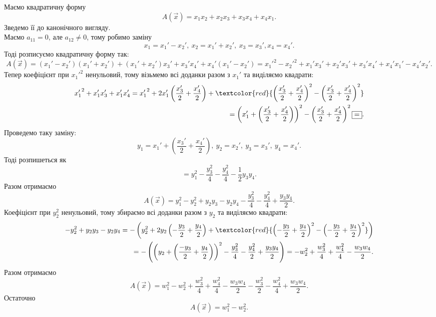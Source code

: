 \documentclass{math_library}
\begin{document}
\begin{example}
Маємо квадратичну форму 
\[
A(\vec{x}) = x_1 x_2 + x_2 x_3 + x_3 x_4 + x_4 x_1.
\]
Зведемо її до канонічного вигляду.\\
Маємо $a_{11} = 0$, але $a_{12} \neq 0$, тому робимо заміну
\[ 
x_1 = x_1' - x_2',\ x_2 = x_1' + x_2',\ x_3 = x_3', x_4 = x_4'.
\]
Тоді розписуємо квадратичну форму так:
\[
A(\vec{x}) = (x_1'-x_2')(x_1'+x_2') + (x_1'+x_2')x_3' + x_3' x_4' + x_4' (x_1' - x_2') = {x_1'}^2 - {x_2'}^2 + x_1'x_3' + x_2'x_3' + x_3' x_4' + x_4' x_1' - x_4' x_2'.
\]
Тепер коефіцієнт при ${x_1'}^2$ ненульовий, тому візьмемо всі доданки разом з $x_1'$ та виділяємо квадрати:
\begin{align*}
{x_1'}^2 + x_1'x_3' + x_1'x_4' = {x_1'}^2 + 2 x_1' \left( \dfrac{x_3'}{2} + \dfrac{x_4'}{2} \right) + \textcolor{red}{\left( \dfrac{x_3'}{2} + \dfrac{x_4'}{2} \right)^2 - \left(\dfrac{x_3'}{2} + \dfrac{x_4'}{2} \right)^2} \\
= \left( x_1' + \left( \dfrac{x_3'}{2} + \dfrac{x_4'}{2} \right) \right)^2 - \left( \dfrac{x_3'}{2} + \dfrac{x_4'}{2} \right)^2 \boxed{=}.
\end{align*}
Проведемо таку заміну: 
\[
y_1 = x_1' + \left( \dfrac{x_3'}{2} + \dfrac{x_4'}{2} \right),\ y_2 = x_2',\ y_3 = x_3',\ y_4 = x_4'.
\]
Тоді розпишеться як
\[
\boxed{=} y_1^2  - \dfrac{y_3^2}{4} - \dfrac{y_4^2}{4} - \dfrac{1}{2}y_3y_4.
\]
Разом отримаємо 
\[
A(\vec{x}) = y_1^2 - y_2^2 + y_2y_3 - y_2y_4 - \dfrac{y_3^2}{4} - \dfrac{y_4^2}{4} + \dfrac{y_3y_4}{2}.
\]
Коефіцієнт при $y_2^2$ ненульовий, тому збираємо всі доданки разом з $y_2$ та виділяємо квадрати:
\begin{align*}
-y_2^2 + y_2y_3 - y_2y_4 = -\left(y_2^2 +2y_2 \left( -\dfrac{y_3}{2} + \dfrac{y_4}{2} \right) + \textcolor{red}{\left( -\dfrac{y_3}{2} + \dfrac{y_4}{2} \right)^2 - \left( -\dfrac{y_3}{2} + \dfrac{y_4}{2} \right)^2} \right) \\ 
= - \left( \left( y_2 + \left( \dfrac{-y_3}{2} + \dfrac{y_4}{2} \right) \right)^2 - \dfrac{y_3^2}{4} - \dfrac{y_4^2}{2} + \dfrac{y_3y_4}{2} \right) = -w_2^2 + \dfrac{w_3^2}{4} + \dfrac{w_4^2}{4} - \dfrac{w_3 w_4}{2}.
\end{align*}
Разом отримаємо \[
A(\vec{x}) = w_1^2 - w_2^2 + \dfrac{w_3^2}{4} + \dfrac{w_4^2}{4} - \dfrac{w_3w_4}{2} - \dfrac{w_3^2}{2} - \dfrac{w_4^2}{4} + \dfrac{w_3w_4}{2}.
\]
Остаточно
\[
A(\vec{x}) = w_1^2 - w_2^2.
\]
\end{example}
\end{document}
